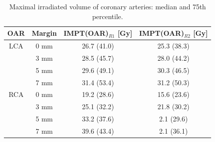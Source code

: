 \begin{table}[H]
  \centering
        \footnotesize
  \caption{Maximal irradiated volume of coronary arteries: median and 75th percentile.}
  \begin{tabular}{|c|c|c|c|}
    \hline\hline
    OAR & Margin & IMPT(OAR)$_{R1}$ [Gy] & IMPT(OAR)$_{R2}$ [Gy] \\
    \hline
    LCA & 0 mm & 26.7 (41.0) & 25.3 (38.3) \\
    & 3 mm & 28.5 (45.7) & 28.0 (44.2) \\
    & 5 mm & 29.6 (49.1) & 30.3 (46.5) \\
    & 7 mm & 31.4 (53.4) & 31.2 (50.3) \\
    \hline
    RCA & 0 mm & 19.2 (28.6) & 15.6 (23.6) \\
    & 3 mm & 25.1 (32.2) & 21.8 (30.2) \\
    & 5 mm & 33.2 (37.6) & 2.1 (29.6) \\
    & 7 mm & 39.6 (43.4) & 2.1 (36.1) \\ 
    \hline\hline
  \end{tabular}
  \label{tab:maxvolume_ca}
\end{table}



\newpage

